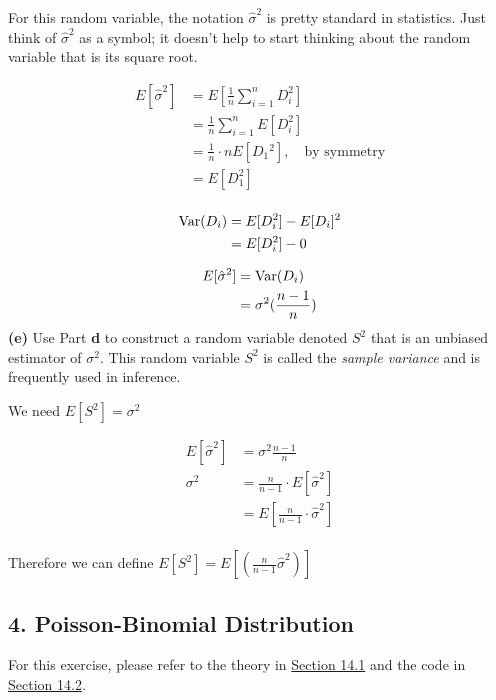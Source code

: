 \documentclass[11pt]{article}
\begin{document}
For this random variable, the notation \(\hat{\sigma}^2\) is pretty
standard in statistics. Just think of \(\hat{\sigma}^2\) as a symbol; it
doesn't help to start thinking about the random variable that is its
square root.


\begin{align*}
	E[\hat \sigma^{2}] &= E\left[\frac{1}{n} \sum_{i=1}^{n}D_{i}^{2}\right] \\
	&= \frac{1}{n}\sum_{i=1}^{n}E[D_{i}^{2}] \\ 
	&= \frac{1}{n} \cdot nE[D_1{^{2}}], \quad \text{by symmetry} \\
	&= E[D_1^{2}] \\
\end{align*}

\begin{align*}
	\operatorname{Var}(D_{i}) &= E[D_{i}^{2}] - E[D_{i}]^{2} \\
	&= E[D_{i}^{2}] - 0 \\
\end{align*}

\begin{align*}
	E[\hat \sigma^{2}] &= \operatorname{Var}(D_{i}) \\
	&= \sigma^{2} (\frac{n-1}{n}) \\
\end{align*}
\textbf{(e)} Use Part \textbf{d} to construct a random variable denoted
\(S^2\) that is an unbiased estimator of \(\sigma^2\). This random
variable \(S^2\) is called the \emph{sample variance} and is frequently
used in inference.

We need $ E[S^{2}] = \sigma^{2} $ 


\begin{align*}
	E[\hat \sigma^{2}] &= \sigma^{2} \frac{n-1}{n} \\
	\sigma^{2} &= \frac{n}{n-1} \cdot E[\hat \sigma^{2}]  \\
	&= E[\frac{n}{n-1} \cdot \hat \sigma^{2}] \\
\end{align*}

Therefore we can define $ E[S^{2}] = E\left[ \left( \frac{n}{n-1} \hat \sigma^{2}\right) \right] $ 
    \newpage

    \subsection{4. Poisson-Binomial
Distribution}\label{poisson-binomial-distribution}

For this exercise, please refer to the theory in
\href{https://data140.org/textbook/content/chapter-14/exact-distribution-of-a-sum/}{Section
14.1} and the code in
\href{https://data140.org/textbook/content/chapter-14/pgfs-in-numpy/}{Section
14.2}.
\end{document}
